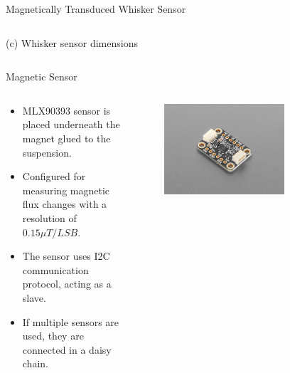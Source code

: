 \documentclass[AIRbeamer
,optEnglish
,optBiber
,optBibstyleAlphabetic
,optBeamerClassicFormat%
]{AIRlatex}
\begin{document}
\begin{frame}[c]{Magnetically Transduced Whisker Sensor}
\begin{columns}[c,onlytextwidth]
            (c) Whisker sensor dimensions
        \end{columns}
    \end{frame}


    \begin{frame}{Magnetic Sensor}
        \begin{columns}[T,onlytextwidth]
            \begin{column}[T]{0.6\textwidth}
                \begin{minipage}[c][.8\textheight][c]{\linewidth}
                    \begin{itemize}
                        \item MLX90393 sensor is placed underneath the magnet glued to the suspension.
                        \item Configured for measuring magnetic flux changes with a resolution of \(0.15 \mu T/LSB\).
                        \item The sensor uses I2C communication protocol, acting as a slave.
                        \item If multiple sensors are used, they are connected in a daisy chain.
                    \end{itemize}
                \end{minipage}
            \end{column}
            \begin{column}[T]{0.4\textwidth}
                \begin{figure}[H]
                    \centering
                    \includegraphics[width=0.7\textwidth]{figures/mlx90393}

\end{figure}
\end{column}
\end{columns}
\end{frame}
\end{document}
